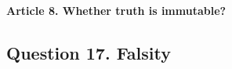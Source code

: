 \documentclass{ucetd}
\begin{document}
\paragraph{Article 8. Whether truth is immutable?}


\subsection{Question 17. Falsity}
\end{document}
